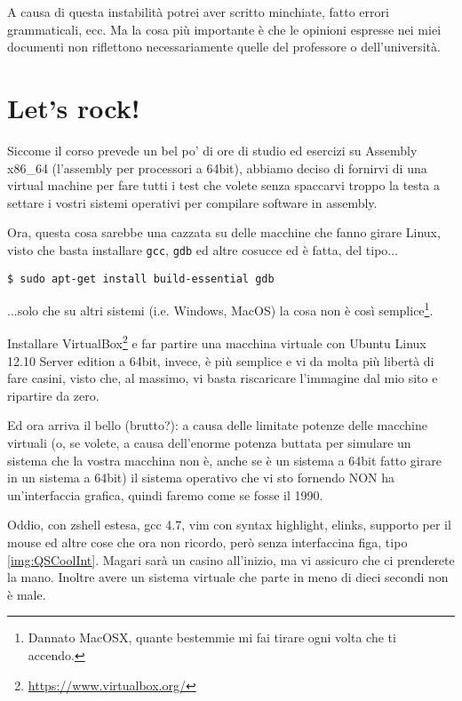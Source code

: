 \documentclass[a4paper]{memoir}
\begin{document}
		A causa di questa instabilità potrei aver scritto minchiate, fatto errori
		grammaticali, ecc. Ma la cosa più
		importante è che le opinioni espresse nei miei documenti non riflettono
		necessariamente quelle del professore o dell'università.

\chapter*{Let's rock!}

	Siccome il corso prevede un bel po' di ore di studio ed esercizi su Assembly x86\_{}64
	(l'assembly per processori a 64bit), abbiamo deciso di fornirvi di una virtual
	machine per fare tutti i test che volete senza spaccarvi troppo la testa a settare
	i vostri sistemi operativi per compilare software in assembly.
	
	Ora, questa cosa sarebbe una cazzata su delle macchine che fanno girare Linux, visto
	che basta installare \texttt{gcc}, \texttt{gdb} ed altre cosucce ed è fatta, del tipo...
	
	\begin{Verbatim}[label=È tutto più semplice con linux quando si parla di programmazione]
$ sudo apt-get install build-essential gdb
	\end{Verbatim}
	
	...solo che su altri sistemi (i.e. Windows, MacOS) la cosa non è così semplice\footnote{Dannato
	MacOSX, quante bestemmie mi fai tirare ogni volta che ti accendo.}.
	
	Installare VirtualBox\footnote{\url{https://www.virtualbox.org/}} e far partire una macchina
	virtuale con Ubuntu Linux 12.10 Server edition
	a 64bit, invece, è più semplice e vi da molta più libertà di fare casini, visto che, al massimo,
	vi basta riscaricare l'immagine dal mio sito e ripartire da zero.
	
	Ed ora arriva il bello (brutto?): a causa delle limitate potenze delle macchine virtuali
	(o, se volete, a causa dell'enorme potenza buttata per simulare un sistema che la vostra macchina
	non è, anche se è un sistema a 64bit fatto girare in un sistema a 64bit) il sistema
	operativo che vi sto fornendo NON ha un'interfaccia grafica, quindi faremo come se fosse il 1990.
	
	Oddio, con zshell estesa, gcc 4.7, vim con syntax highlight, elinks, supporto per il mouse ed altre cose
	che ora non ricordo, però senza interfaccina figa, tipo \ref{img:QSCoolInt}. Magari sarà un casino
	all'inizio, ma vi assicuro che ci prenderete la mano. Inoltre avere un sistema virtuale che parte
	in meno di dieci secondi non è male.
	
\end{document}
